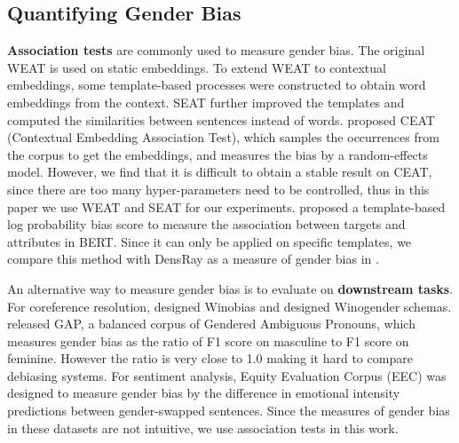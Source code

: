 \subsection{Quantifying Gender Bias}
\textbf{Association tests} are commonly used to measure
gender bias. The original WEAT is used on static
embeddings. To extend WEAT to contextual embeddings, some
template-based processes
\cite{karve2019conceptor,kurita2019measuring,Tan2019AssessingSA}
were constructed to obtain word embeddings from the
context. SEAT further improved the templates and computed
the similarities between sentences instead of
words.  proposed CEAT (Contextual
Embedding Association Test), which samples the occurrences
from the corpus to get the embeddings, and measures the bias
by a random-effects model. However, we find that it is
difficult to obtain a stable result on CEAT, since there are too many hyper-parameters need to be controlled, thus in this paper we  use WEAT and SEAT for our
experiments.  proposed a
template-based log probability bias score to measure the
association between targets and attributes in BERT. Since it
can only be applied on specific templates, we compare this
method with DensRay as a measure of gender bias in
.

An alternative way to measure gender bias is to evaluate on
\textbf{downstream tasks}. For coreference resolution,
 designed Winobias and
 designed Winogender
schemas.  released GAP, a balanced
corpus of Gendered Ambiguous Pronouns, which measures gender
bias as the ratio of F1 score on masculine to F1 score on
feminine. However the ratio is very close to 1.0
\cite{Chada_2019,Attree_2019} making it hard to compare
debiasing systems. For sentiment analysis, Equity Evaluation
Corpus (EEC) \cite{Kiritchenko_2018} was designed to measure
gender bias by the difference in emotional intensity
predictions between gender-swapped sentences. Since the
measures of gender bias in these datasets are not
intuitive, we use association tests in
this work.

